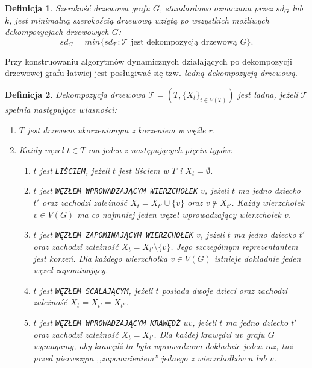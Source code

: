 \documentclass[12pt, oneside]{report}
\newtheorem{definition}{Definicja}
\begin{document}
\begin{definition}
\em \emph{Szerokość drzewowa grafu $G$}, standardowo oznaczana przez $sd_G$ lub $k$, jest minimalną szerokością drzewową wziętą po wszystkich możliwych dekompozycjach drzewowych $G$: $$sd_G = min \{sd_\mathcal{T}: \mathcal{T} \text{ jest dekompozycją drzewową }G\}.$$
\end{definition}

Przy konstruowaniu algorytmów dynamicznych działających po dekompozycji drzewowej grafu łatwiej jest posługiwać się tzw. \emph{ładną dekompozycją drzewową}.

\begin{definition}
\em Dekompozycja drzewowa $\mathcal{T} = (T, \{X_t\}_{t \in V(T)})$ jest \emph{ładna}, jeżeli $\mathcal{T}$ spełnia następujące własności:
\begin{enumerate}[label=(\roman*)]
	\item{$T$ jest drzewem ukorzenionym z korzeniem w węźle $r$.}
	\item{Każdy węzeł $t \in T$ ma jeden z następujących pięciu typów:}
	\begin{enumerate}[label=\arabic*)]
		\item{$t$ jest \texttt{LIŚCIEM}, jeżeli $t$ jest liściem w $T$ i $X_t = \emptyset$.}
		\item{$t$ jest \texttt{WĘZŁEM WPROWADZAJĄCYM WIERZCHOŁEK} $v$, jeżeli $t$ ma jedno dziecko $t'$ oraz zachodzi zależność $X_t = X_{t'} \cup \{v\}$ oraz $v \notin X_{t'}$. Każdy wierzchołek $v \in V(G)$ ma co najmniej jeden węzeł wprowadzający wierzchołek $v$.}
		\item{$t$ jest \texttt{WĘZŁEM ZAPOMINAJĄCYM WIERZCHOŁEK} $v$, jeżeli $t$ ma jedno dziecko $t'$ oraz zachodzi zależność $X_t = X_{t'} \setminus \{v\}$. Jego szczególnym reprezentantem jest korzeń. Dla każdego wierzchołka $v \in V(G)$ istnieje dokładnie jeden węzeł zapominający.}
		\item{$t$ jest \texttt{WĘZŁEM SCALAJĄCYM}, jeżeli $t$ posiada dwoje dzieci oraz zachodzi zależność $X_t = X_{t'} = X_{t''}$.}
		\item{$t$ jest \texttt{WĘZŁEM WPROWADZAJĄCYM KRAWĘDŹ} $uv$, jeżeli $t$ ma jedno dziecko $t'$ oraz zachodzi zależność $X_t = X_{t'}$. Dla każdej krawędzi $uv$ grafu $G$ wymagamy, aby krawędź ta była wprowadzona dokładnie jeden raz, tuż przed pierwszym ,,zapomnieniem'' jednego z wierzchołków $u$ lub $v$.}
\end{enumerate}
\end{enumerate}
\end{definition}
\end{document}
